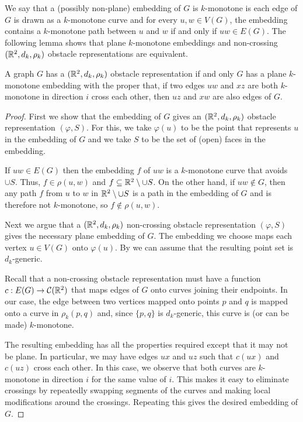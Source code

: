 \documentclass{patmorin}
\begin{document}
We say that a (possibly non-plane) embedding of $G$ is $k$-monotone is
each edge of $G$ is drawn as a $k$-monotone curve and for every $u,w\in
V(G)$, the embedding contains a $k$-monotone path between $u$ and $w$
if and only if $uw\in E(G)$.  The following lemma shows that plane
$k$-monotone embeddings and non-crossing $(\mathbb{R}^2,d_k,\rho_k)$ obstacle
representations are equivalent.

\begin{lem}
   A graph $G$ has a $(\mathbb{R}^2,d_k,\rho_k)$ obstacle representation if and
   only $G$ has a plane $k$-monotone embedding with the proper that,
   if two edges $uw$ and $xz$ are both $k$-monotone in direction $i$
   cross each other, then $uz$ and $xw$ are also edges of $G$.
\end{lem}

\begin{proof}
   First we show that the embedding of $G$ gives an $(\mathbb{R}^2,d_k,\rho_k)$
   obstacle representation $(\varphi, S)$. For this, we take $\varphi(u)$
   to be the point that represents $u$ in the embedding of $G$ and we
   take $S$ to be the set of (open) faces in the embedding.

   If $uw\in E(G)$ then the embedding $f$ of $uw$ is a $k$-monotone
   curve that avoids $\cup S$.  Thus, $f\in\rho(u,w)$ and $f\subseteq
   \mathbb{R}^2\setminus{\cup S}$.  On the other hand, if $uw\not\in G$,
   then any path $f$ from $u$ to $w$ in $\mathbb{R}^2\setminus{\cup S}$ is
   a path in the embedding of $G$ and is therefore not $k$-monotone,
   so $f\not\in \rho(u,w)$.

   Next we argue that a $(\mathbb{R}^2,d_k,\rho_k)$ non-crossing obstacle
   representation $(\varphi, S)$ gives the necessary plane embedding
   of $G$.  The embedding we choose maps each vertex $u\in V(G)$ onto
   $\varphi(u)$.  By  we can assume that the resulting
   point set is $d_k$-generic.  

   Recall that a non-crossing obstacle representation must have a
   function $c:E(G)\to\mathcal{C}(\mathbb{R}^2)$ that maps edges of $G$ onto
   curves joining their endpoints.  In our case, the edge between two
   vertices mapped onto points $p$ and $q$ is mapped onto a curve in
   $\rho_k(p,q)$ and, since $\{p,q\}$ is $d_k$-generic, this curve is
   (or can be made) $k$-monotone.

   The resulting embedding has all the properties required except that
   it may not be plane.  In particular, we may have edges $ux$ and $uz$ 
   such that $c(ux)$ and $c(uz)$ cross each other.
   In this case, we observe that both
   curves are $k$-monotone in direction $i$ for the same value of $i$.
   This makes it easy to eliminate crossings by repeatedly swapping
   segments of the curves and making local modifications around the
   crossings.  Repeating this gives the desired embedding of $G$.
\end{proof}
\end{document}
